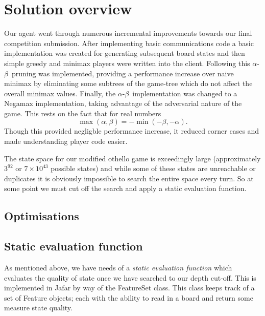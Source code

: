 \documentclass[11pt]{article}
\newcommand{\ab}{$\alpha$-$\beta$}
\begin{document}
\section{Solution overview}
\label{sec:solution_overview}
Our agent went through numerous incremental improvements towards our final
competition submission. After implementing basic communications code a basic
implementation was created for generating subsequent board states and then
simple greedy and minimax players were written into the client. Following
this \ab\ pruning was implemented, providing a performance increase over
naive minimax by eliminating some subtrees of the game-tree which do not
affect the overall minimax values.
Finally, the \ab\ implementation was
changed to a Negamax implementation, taking advantage of the adversarial
nature of the game. This rests on the fact that for real numbers
\[
  \max(\alpha, \beta) = -\min(-\beta, -\alpha).
\]
Though this provided negligble performance increase, it
reduced corner cases and made understanding player code easier.

The state space for our modified othello game is exceedingly large
(approximately $3^{92}$ or $7 \times 10^{43}$ possible states) and while some
of these states are unreachable or duplicates it is obviously impossible to
search the entire space every turn. So at some point we must cut off the
search and apply a static evaluation function.

\subsection{Optimisations}
\label{sub:optimisations}

\subsection{Static evaluation function}
\label{sub:eval_func}
As mentioned above, we have needs of a \emph{static evaluation function} which
evaluates the quality of state once we have searched to our depth cut-off.
This is implemented in Jafar by way of the FeatureSet class. This class keeps
track of a set of Feature objects; each with the ability to read in a board and
return some measure state quality.
\end{document}
